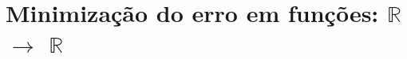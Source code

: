 
\chapter{Minimização do erro em funções: $\mathbb{R}$ $\rightarrow$ $\mathbb{R}$}


\newpage


\newpage


\newpage


